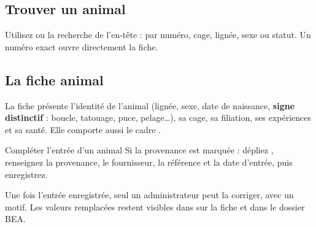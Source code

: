 \documentclass[11pt,a4paper]{article}
\begin{document}
\subsection{Trouver un animal}
Utilisez  ou la recherche de l'en-tête :
par numéro, cage, lignée, sexe ou statut. Un numéro exact ouvre directement la
fiche.

\subsection{La fiche animal}
La fiche présente l'identité de l'animal (lignée, sexe, date de naissance,
\textbf{signe distinctif} : boucle, tatouage, puce, pelage…), sa cage, sa
filiation, ses expériences et sa santé. Elle comporte aussi le cadre
.

\begin{procedure}{Compléter l'entrée d'un animal}
Si la provenance est marquée  : dépliez , renseignez la provenance, le fournisseur, la
référence et la date d'entrée, puis enregistrez.
\end{procedure}

\begin{trace}
Une fois l'entrée enregistrée, seul un administrateur peut la corriger, avec
un motif. Les valeurs remplacées restent visibles dans  sur la fiche et dans le dossier BEA.
\end{trace}
\end{document}
